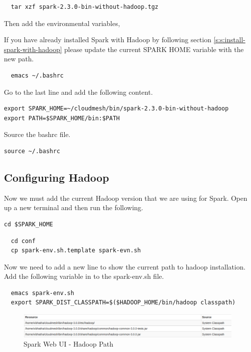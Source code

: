 \begin{lstlisting}
  tar xzf spark-2.3.0-bin-without-hadoop.tgz  
\end{lstlisting}

Then add the environmental variables,

\begin{NOTE}
  If you have already installed Spark with Hadoop by following section
  \ref{s:s:install-spark-with-hadoop} please update the current SPARK
  HOME variable with the new path.
\end{NOTE}

\begin{lstlisting}
  emacs ~/.bashrc  
\end{lstlisting}

Go to the last line and add the following content.

\begin{lstlisting}
export SPARK_HOME=~/cloudmesh/bin/spark-2.3.0-bin-without-hadoop
export PATH=$SPARK_HOME/bin:$PATH
\end{lstlisting}  

Source the bashrc file.

\begin{lstlisting}
source ~/.bashrc
\end{lstlisting}

\subsection{Configuring Hadoop}

Now we must add the current Hadoop version that we are using for
Spark. Open up a new terminal and then run the following.

\begin{lstlisting}
cd $SPARK_HOME
\end{lstlisting}

\begin{lstlisting}
  cd conf
  cp spark-env.sh.template spark-evn.sh
\end{lstlisting}

Now we need to add a new line to show the current path to
hadoop installation. Add the following variable in to the
spark-env.sh file.

\begin{lstlisting}
  emacs spark-env.sh
  export SPARK_DIST_CLASSPATH=$($HADOOP_HOME/bin/hadoop classpath)
\end{lstlisting}

\begin{figure}
\centering
\includegraphics[width=\textwidth,height=\textheight,keepaspectratio]{images/spark-hadoop.png}
\caption{Spark Web UI - Hadoop Path}
\end{figure}


